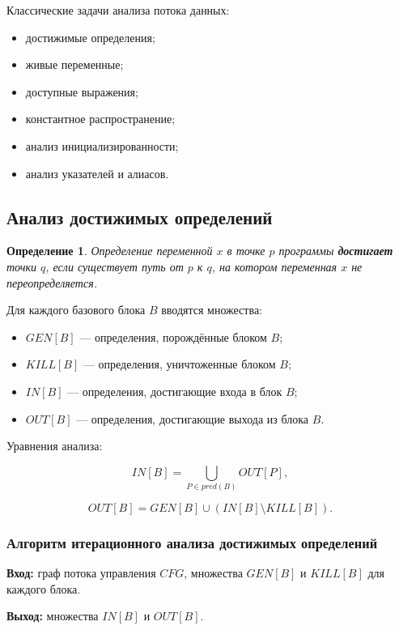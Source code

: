 \documentclass[12pt,a4paper]{article}
\newtheorem{definition}{Определение}
\begin{document}
Классические задачи анализа потока данных:

\begin{itemize}
  \item достижимые определения;
  \item живые переменные;
  \item доступные выражения;
  \item константное распространение;
  \item анализ инициализированности;
  \item анализ указателей и алиасов.
\end{itemize}

\subsection{Анализ достижимых определений}

\begin{definition}
Определение переменной $x$ в точке $p$ программы \textbf{достигает} точки $q$, если существует путь от $p$ к $q$, на котором переменная $x$ не переопределяется.
\end{definition}

Для каждого базового блока $B$ вводятся множества:

\begin{itemize}
  \item $GEN[B]$ --- определения, порождённые блоком $B$;
  \item $KILL[B]$ --- определения, уничтоженные блоком $B$;
  \item $IN[B]$ --- определения, достигающие входа в блок $B$;
  \item $OUT[B]$ --- определения, достигающие выхода из блока $B$.
\end{itemize}

Уравнения анализа:

\[
IN[B] = \bigcup_{P \in pred(B)} OUT[P],
\]

\[
OUT[B] = GEN[B] \cup (IN[B] \setminus KILL[B]).
\]

\subsubsection{Алгоритм итерационного анализа достижимых определений}

\textbf{Вход:} граф потока управления $CFG$, множества $GEN[B]$ и $KILL[B]$ для каждого блока.

\textbf{Выход:} множества $IN[B]$ и $OUT[B]$.
\end{document}
